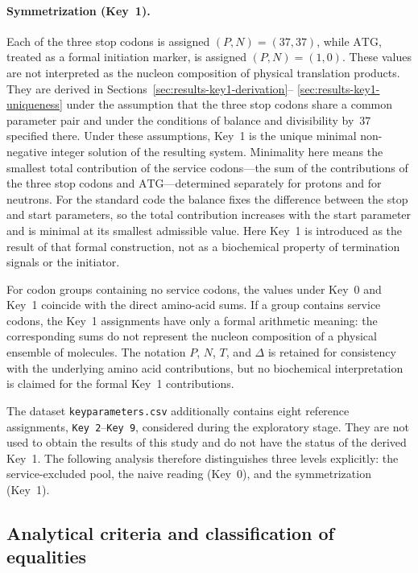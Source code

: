 \documentclass[11pt,a4paper]{article}
\renewcommand{\_}{\origunderscore\allowbreak}
\begin{document}
\paragraph{Symmetrization (Key~1).}
Each of the three stop codons is assigned $(P,N)=(37,37)$, while
$\mathrm{ATG}$, treated as a formal initiation marker, is assigned
$(P,N)=(1,0)$. These values are not interpreted as the nucleon
composition of physical translation products. They are derived in
Sections~\ref{sec:results-key1-derivation}--%
\ref{sec:results-key1-uniqueness} under the assumption that the three
stop codons share a common parameter pair and under the conditions of
balance and divisibility by~$37$ specified there. Under these
assumptions, Key~1 is the unique minimal non-negative integer solution
of the resulting system. Minimality here means the smallest total contribution of
the service codons---the sum of the contributions of the
three stop codons and $\mathrm{ATG}$---determined
separately for protons and for neutrons. For the standard
code the balance fixes the difference between the stop and
start parameters, so the total contribution increases with
the start parameter and is minimal at its smallest
admissible value. Here Key~1 is introduced as the result
of that formal construction, not as a biochemical property of
termination signals or the initiator.

For codon groups containing no service codons, the values under
Key~0 and Key~1 coincide with the direct amino-acid sums. If a group
contains service codons, the Key~1 assignments have only a formal
arithmetic meaning: the corresponding sums do not represent the
nucleon composition of a physical ensemble of molecules. The notation $P$, $N$, $T$, and $\Delta$ is retained
for consistency with the underlying amino acid contributions,
but no biochemical interpretation is claimed for the formal
Key~1 contributions.

The dataset \texttt{key\_parameters.csv} additionally contains eight
reference assignments, \texttt{Key~2}--\texttt{Key~9}, considered
during the exploratory stage. They are not used to obtain the results
of this study and do not have the status of the derived Key~1. The
following analysis therefore distinguishes three levels explicitly:
the service-excluded pool, the naive reading (Key~0), and the
symmetrization (Key~1).

\subsection{Analytical criteria and classification of equalities}
\label{sec:criteria}
\end{document}
